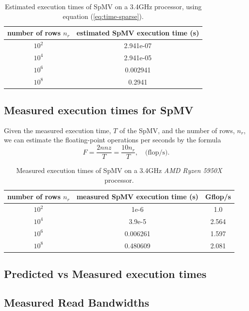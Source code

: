\documentclass[a4paper, 11pt]{article}
\begin{document}
\begin{table}[H]\label{ta:predicted-times-sparse}
\centering
\begin{tabular}[c]{|c|c|}
\hline
number of rows $n_r$ &  estimated SpMV execution time (s) \\
\hline
$10^2$ & 2.941e-07 \\
$10^4$ & 2.941e-05 \\
$10^6$ & 0.002941 \\
$10^8$ & 0.2941 \\
\hline
\end{tabular}
\caption{Estimated execution times of SpMV on a 3.4GHz processor, using equation (\ref{eq:time-sparse}).}
\end{table}

\subsection{Measured execution times for SpMV}
Given the measured execution time, $T$ of the SpMV, and the number of rows, $n_r$,  we can estimate the floating-point operations per seconds
by the formula
\[ F = \frac{2nnz}{T} = \frac{10n_r}{T}, \quad \text{(flop/s).} \]

\begin{table}[H]\label{ta:measured-times-sparse}
\centering
\begin{tabular}[c]{|c|c|c|}
\hline
number of rows $n_r$ &  measured SpMV execution time (s) & Gflop/s \\
\hline
$10^2$ & 1e-6  & 1.0 \\
$10^4$ & 3.9e-5 & 2.564 \\
$10^6$ & 0.006261 & 1.597 \\
$10^8$ & 0.480609 & 2.081\\
\hline
\end{tabular}
\caption{Measured execution times of SpMV on a 3.4GHz \textit{AMD Ryzen 5950X} processor.}
\end{table}

\subsection{Predicted vs Measured execution times}

\subsection{Measured Read Bandwidths}
\end{document}
